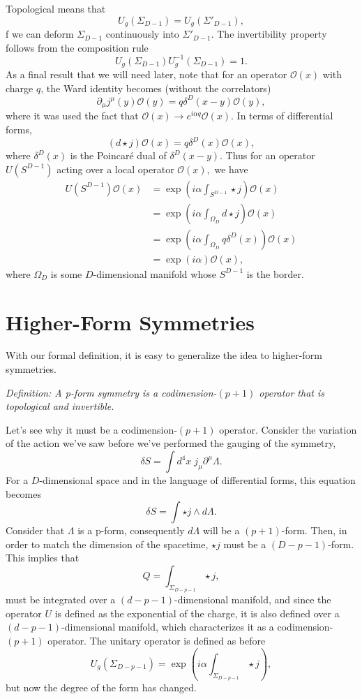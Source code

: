 \documentclass{article}
\begin{document}
Topological means that
$$
U_g(\Sigma_{D-1})=U_g(\Sigma'_{D-1}),
$$
f we can deform $\Sigma_{D-1}$ continuously into $\Sigma'_{D-1}.$  The invertibility property follows from the composition rule 
$$
U_g(\Sigma_{D-1})U^{-1}_g(\Sigma_{D-1})=1.
$$
As a final result that we will need later, note that for an operator $\mathcal{O}(x) $ with charge $q$, the Ward identity becomes (without the correlators) 
$$\partial_\mu j^\mu(y)\mathcal{O}(y)=q\delta^{D}(x-y)\mathcal{O}(y),
$$
where it was used the fact that $\mathcal{O}(x)\to e^{i\alpha q}\mathcal{O}(x)$. In terms of differential forms, 
$$
(d\star j)\mathcal{O}(x)=q\delta^{D}(x)\mathcal{O}(x),
$$
where $\delta^D(x)$ is the Poincaré dual of $\delta^D(x-y)$. Thus for an operator $U(S^{D-1})$ acting over a local operator $\mathcal{O}(x), $ we have 
\begin{align*}
	U(S^{D-1})\mathcal{O}(x)&=\exp\left(i\alpha\int_{S^{D-1}}\star j\right)\mathcal{O}(x)\\&=\exp\left(i\alpha\int_{\Omega_D}d\star j\right)\mathcal{O}(x)\\&=\exp\left(i\alpha\int_{\Omega_D}q\delta^D(x)\right)\mathcal O(x)\\&=\exp(i\alpha)\mathcal{O}(x),
\end{align*}
where $\Omega_D$ is some $D$-dimensional manifold whose $S^{D-1}$ is the border.  
\section*{Higher-Form Symmetries}
With our formal definition, it is easy to generalize the idea to higher-form symmetries. 

\textit{Definition: A p-form symmetry is a codimension-$(p+1)$ operator that is topological and invertible. }

Let’s see why it must be a codimension-$(p+1)$ operator. Consider the variation of the action we’ve saw before we’ve performed the gauging of the symmetry,
$$
\delta S=\int d^4x\;j_\mu\partial^\mu\Lambda.
$$
For a $D$-dimensional space and in the language of differential forms, this equation becomes 
$$
\delta S=\int\star j\wedge d\Lambda.
$$
Consider that $\Lambda$  is a p-form, consequently $d\Lambda$ will be a $(p+1)$-form. Then, in order to match the dimension of the spacetime, $\star j$ must be a $(D-p-1)$-form. This implies that 
$$
Q=\int_{\Sigma_{D-p-1}} \star j,
$$
must be integrated over a $(d-p-1)$-dimensional manifold, and since the operator $U$ is defined as the exponential of the charge, it is also defined over a  $(d-p-1)$-dimensional manifold, which characterizes it as a codimension-$(p+1)$ operator.  The unitary operator is defined as before
$$
U_g(\Sigma_{D-p-1})=\exp\left(i\alpha\int_{\Sigma_{D-p-1}}\star j\right),
$$
but now the degree of the form has changed. 
\end{document}
